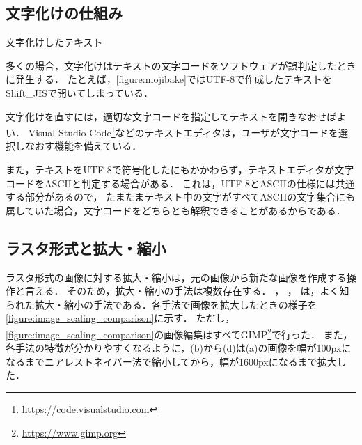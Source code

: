 \documentclass[../../index]{subfiles}
\begin{document}
\subsection{文字化けの仕組み}
\begin{floatingfigure}{\smallfiguresize}
  \centering
  \caption{文字化けしたテキスト}
  \label{figure:mojibake}
\end{floatingfigure}

多くの場合，文字化けはテキストの文字コードをソフトウェアが誤判定したときに発生する．
たとえば，\cref{figure:mojibake}ではUTF-8で作成したテキストをShift\_JISで開いてしまっている．

文字化けを直すには，適切な文字コードを指定してテキストを開きなおせばよい．
Visual Studio Code\footnote{\url{https://code.visualstudio.com}}などのテキストエディタは，ユーザが文字コードを選択しなおす機能を備えている．

また，テキストをUTF-8で符号化したにもかかわらず，テキストエディタが文字コードをASCIIと判定する場合がある．
これは，UTF-8とASCIIの仕様には共通する部分があるので，
たまたまテキスト中の文字がすべてASCIIの文字集合にも属していた場合，文字コードをどちらとも解釈できることがあるからである．

\subsection{ラスタ形式と拡大・縮小}
\label{subsection:raster_scaling}
ラスタ形式の画像に対する拡大・縮小は，元の画像から新たな画像を作成する操作と言える．
そのため，拡大・縮小の手法は複数存在する．
，
，
は，よく知られた拡大・縮小の手法である．各手法で画像を拡大したときの様子を\cref{figure:image_scaling_comparison}に示す．
ただし，\cref{figure:image_scaling_comparison}の画像編集はすべてGIMP\footnote{\url{https://www.gimp.org}}で行った．
また，各手法の特徴が分かりやすくなるように，(b)から(d)は(a)の画像を幅が100pxになるまでニアレストネイバー法で縮小してから，幅が1600pxになるまで拡大した．
\end{document}
